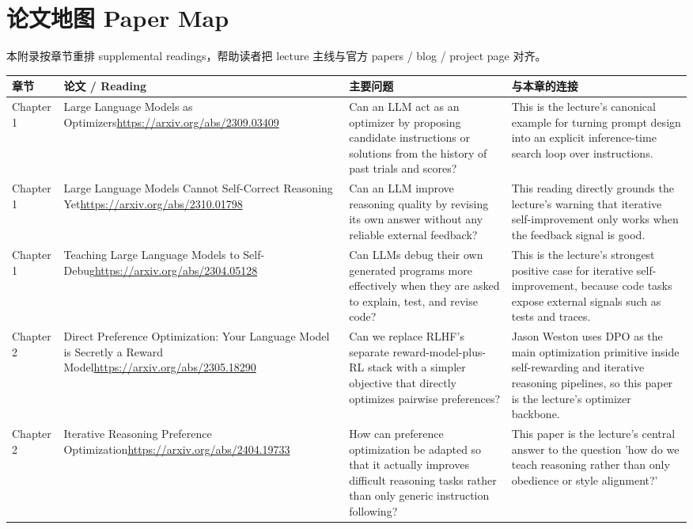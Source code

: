 \chapter{论文地图 Paper Map}
本附录按章节重排 supplemental readings，帮助读者把 lecture 主线与官方 papers / blog / project page 对齐。
\small
\begin{longtable}{p{}p{}p{}p{}}
\toprule
章节 & 论文 / Reading & 主要问题 & 与本章的连接 \\
\midrule
\endhead
Chapter 1 & Large Language Models as Optimizers\newline\url{https://arxiv.org/abs/2309.03409} & Can an LLM act as an optimizer by proposing candidate instructions or solutions from the history of past trials and scores? & This is the lecture's canonical example for turning prompt design into an explicit inference-time search loop over instructions. \\
Chapter 1 & Large Language Models Cannot Self-Correct Reasoning Yet\newline\url{https://arxiv.org/abs/2310.01798} & Can an LLM improve reasoning quality by revising its own answer without any reliable external feedback? & This reading directly grounds the lecture's warning that iterative self-improvement only works when the feedback signal is good. \\
Chapter 1 & Teaching Large Language Models to Self-Debug\newline\url{https://arxiv.org/abs/2304.05128} & Can LLMs debug their own generated programs more effectively when they are asked to explain, test, and revise code? & This is the lecture's strongest positive case for iterative self-improvement, because code tasks expose external signals such as tests and traces. \\
Chapter 2 & Direct Preference Optimization: Your Language Model is Secretly a Reward Model\newline\url{https://arxiv.org/abs/2305.18290} & Can we replace RLHF's separate reward-model-plus-RL stack with a simpler objective that directly optimizes pairwise preferences? & Jason Weston uses DPO as the main optimization primitive inside self-rewarding and iterative reasoning pipelines, so this paper is the lecture's optimizer backbone. \\
Chapter 2 & Iterative Reasoning Preference Optimization\newline\url{https://arxiv.org/abs/2404.19733} & How can preference optimization be adapted so that it actually improves difficult reasoning tasks rather than only generic instruction following? & This paper is the lecture's central answer to the question 'how do we teach reasoning rather than only obedience or style alignment?' \\

\end{longtable}
